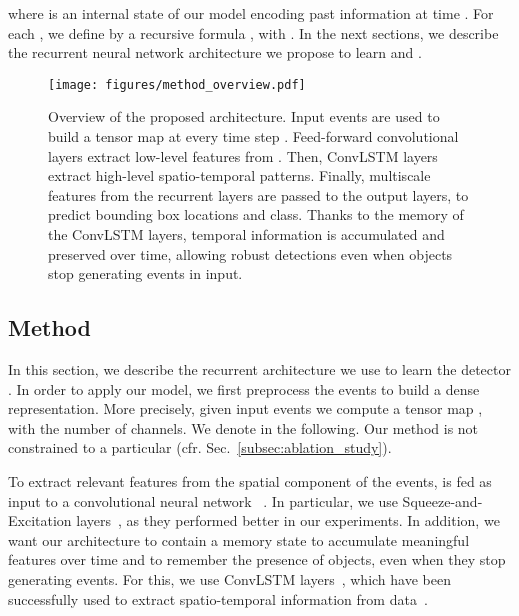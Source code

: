 \documentclass{article}
\begin{document}
where  is an internal state of our model encoding past information at time . For each , we define  by a recursive formula , with .
In the next sections, we describe the recurrent neural network architecture we propose to learn  and .
\begin{figure}[t]
    \centering
    \texttt{[image: figures/method\_overview.pdf]}
    \caption{Overview of the proposed architecture. Input events are used to build a tensor map  at every time step . Feed-forward convolutional layers extract low-level features from . Then, ConvLSTM layers extract high-level spatio-temporal patterns. Finally, multiscale features from the recurrent layers are passed to the output layers, to predict bounding box locations and class. 
Thanks to the memory of the ConvLSTM layers, temporal information is accumulated and preserved over time, allowing robust detections even when objects stop generating events in input.
}
    \label{fig:method_overview}
    \vspace{-4mm}
\end{figure}

\subsection{Method}
\label{sec:method}
In this section, we describe the recurrent architecture we use to learn the detector . In order to apply our model, we first preprocess the events to build a dense 
representation. More precisely, given input events  we compute a tensor map , with  the number of channels. 
We denote  in the following. Our method is not constrained to a particular  (cfr. Sec.~\ref{subsec:ablation_study}). 




To extract relevant features from the spatial component of the events,  is fed as input to a convolutional neural network ~\cite{krizhevsky2012imagenet,liu2016ssd}. In particular, we use
Squeeze-and-Excitation layers~\cite{hu2017squeezeandexcitation}, 
as they performed better in our experiments.
In addition, we want our architecture to contain a memory state to accumulate 
meaningful features over time and to remember the presence of objects, even when 
they stop generating events. 
For this, we use ConvLSTM layers~\cite{xingjian2015convolutional}, which have been 
successfully used to extract spatio-temporal information from 
data~\cite{finn2016unsupervised,liu2018mobile}.
\end{document}
